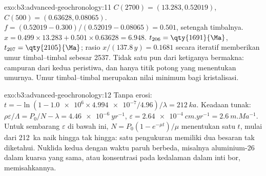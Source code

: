 \begin{solution}{exo:b3:advanced-geochronology:11}
$C(2700) = (13.283, 0.52019)$, $C(500) = (0.63628, 0.08065)$. $f = (0.52019 -
0.300)/(0.52019 - 0.08065) = 0.501$, setengah timbalnya. $x = 0.499\times13.283 +
0.501\times0.63628 = 6.948$. $t_{206} = \qty{1691}{\Ma}$, $t_{207} =
\qty{2105}{\Ma}$; rasio $x/(137.8\,y) = 0.1681$ secara iteratif memberikan
umur timbal--timbal sebesar \qty{2537}{\Ma}. Tidak satu pun dari ketiganya bermakna:
campuran dari kedua peristiwa, dan hanya titik potong yang menentukan umurnya. Umur timbal--timbal
merupakan nilai minimum bagi kristalisasi.
\end{solution}

\begin{solution}{exo:b3:advanced-geochronology:12}
Tanpa erosi: $t = -\ln(1 - \num{1.0e6}\times\num{4.994e-7}/4.96)/\lambda =
\qty{212}{ka}$. Keadaan tunak: $\rho\varepsilon/\Lambda = P_0/N - \lambda =
\qty{4.46e-6}{yr^{-1}}$, $\varepsilon = \qty{2.64e-4}{cm.yr^{-1}} =
\qty{2.6}{m.Ma^{-1}}$. Untuk sembarang $\varepsilon$ di bawah ini, $N =
P_0(1 - e^{-\mu t})/\mu$ menentukan satu $t$, mulai dari \qty{212}{ka} naik hingga
tak hingga: satu pengukuran memiliki dua besaran tak diketahui. Nuklida kedua dengan
waktu paruh berbeda, misalnya aluminium-26 dalam kuarsa yang sama, atau konsentrasi pada
kedalaman dalam inti bor, memisahkannya.
\end{solution}

